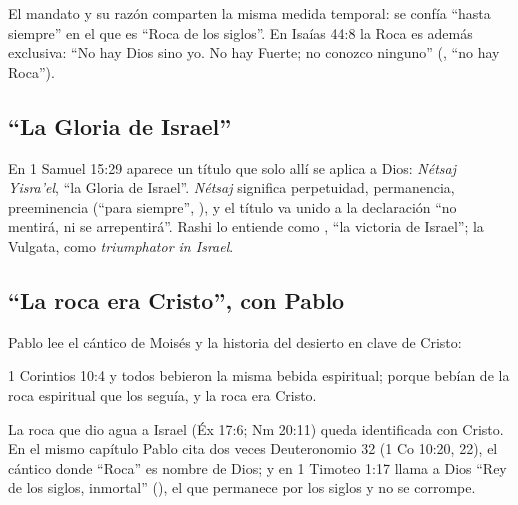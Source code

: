 El mandato y su razón comparten la misma medida temporal: se confía ``hasta siempre'' en el que es ``Roca de los siglos''. En Isaías 44:8 la Roca es además exclusiva: ``No hay Dios sino yo. No hay Fuerte; no conozco ninguno'' (, ``no hay Roca'').

\subsection{“La Gloria de Israel”}
En 1 Samuel 15:29 aparece un título que solo allí se aplica a Dios:  \emph{Nétsaj Yisra'el}, ``la Gloria de Israel''. \emph{Nétsaj} significa perpetuidad, permanencia, preeminencia (``para siempre'', ), y el título va unido a la declaración ``no mentirá, ni se arrepentirá''. Rashi lo entiende como , ``la victoria de Israel''; la Vulgata, como \emph{triumphator in Israel}.


\subsection{“La roca era Cristo”, con Pablo}
Pablo lee el cántico de Moisés y la historia del desierto en clave de Cristo:

\begin{verso}{1 Corintios 10:4}
y todos bebieron la misma bebida espiritual; porque bebían de la roca espiritual que los seguía, y la roca era Cristo.
\end{verso}

La roca que dio agua a Israel (Éx 17:6; Nm 20:11) queda identificada con Cristo. En el mismo capítulo Pablo cita dos veces Deuteronomio 32 (1 Co 10:20, 22), el cántico donde ``Roca'' es nombre de Dios; y en 1 Timoteo 1:17 llama a Dios ``Rey de los siglos, inmortal'' (), el que permanece por los siglos y no se corrompe.


